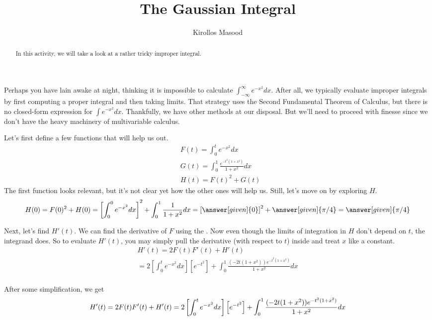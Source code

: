 \documentclass{ximera}
\title{The Gaussian Integral}
\author{Kirollos Masood}
\begin{document}
\begin{abstract}
In this activity, we will take a look at a rather tricky improper integral.
\end{abstract}
\maketitle

Perhaps you have lain awake at night, thinking it is impossible to calculate $\int_{-\infty}^{\infty} e^{-x^2}dx$. After all, we typically evaluate improper integrals by first computing a proper integral and then taking limits. That strategy uses the Second Fundamental Theorem of Calculus, but there is no closed-form expression for $\int e^{-x^2} dx$. Thankfully, we have other methods at our disposal. But we'll need to proceed with finesse since we don't have the heavy machinery of multivariable calculus.

Let's first define a few functions that will help us out.
\begin{align*}
	&F(t)=\int_{0}^{t} e^{-x^2}dx \\
	&G(t)=\int_{0}^{1} \frac{e^{-t^2(1+x^2)}}{1+x^2} dx \\
	&H(t)=F(t)^2+G(t)
\end{align*}
The first function looks relevant, but it's not clear yet how the other ones will help us. Still, let's move on by exploring $H$.
\begin{align*}
H(0)= F(0)^2+H(0)=\left[\int_{0}^{0} e^{-x^2}dx \right]^2+\int_{0}^{1} \frac{1}{1+x^2} dx =  \left[ \answer[given]{0} \right]^2 + \answer[given]{\pi/4} = \answer[given]{\pi/4}
\end{align*}

Next, let's find $H'(t)$. We can find the derivative of $F$ using the . Now even though the limits of integration in $H$ don't depend on $t$, the integrand does. So to evaluate $H'(t)$, you may simply pull the derivative (with respect to $t$) inside and treat $x$ like a constant.
\begin{align*}
H'(t) =2F(t)F'(t)+H'(t) \\
=2 \left[ \int_{0}^{t} e^{-x^2}dx \right] \left[ e^{-t^2} \right]+\int_{0}^{1} \frac{ (-2t(1+x^2)) e^{-t^2(1+x^2)}}{1+x^2} dx \\
\end{align*}

\begin{exercise}
	After some simplification, we get
	$$
	H'(t) =2F(t)F'(t)+H'(t) \\
	=2 \left[ \int_{0}^{t} e^{-x^2}dx \right] \left[ e^{-t^2} \right]+\int_{0}^{1} \frac{ (-2t(1+x^2)) e^{-t^2(1+x^2)}}{1+x^2} dx \\
	$$
	

\end{exercise}
\end{document}
